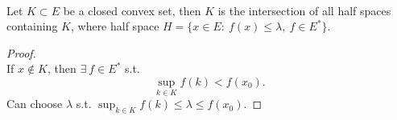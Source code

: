 \begin{corollary}\ \\
Let $K \subset E$ be a closed convex set, then $K$ is the intersection of all half spaces containing $K$, where half space $H = \{x \in E:\ f(x) \leq \lambda,\ f \in E^*\}$.
\end{corollary}
\begin{proof}\ \\
If $x \notin K$, then $\exists\ f \in E^*$ s.t.
\begin{equation*}
    \sup_{k \in K} f(k) < f(x_0).
\end{equation*}
Can choose $\lambda$ s.t. $\sup_{k \in K} f(k) \leq \lambda \leq f(x_0)$.
\end{proof}













